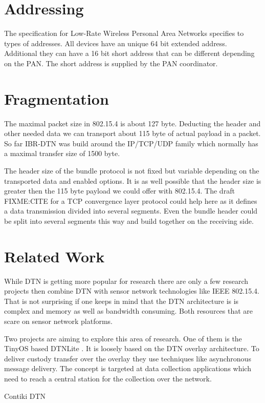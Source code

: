 \section{Addressing}

The specification for Low-Rate Wireless Personal Area Networks specifies to
types of addresses. All devices have an unique 64 bit extended address.
Additional they can have a 16 bit short address that can be different depending
on the PAN. The short address is supplied by the PAN coordinator.

\section{Fragmentation}

The maximal packet size in 802.15.4 is about 127 byte. Deducting the header
and other needed data we can transport about 115 byte of actual payload in a
packet. So far IBR-DTN was build around the IP/TCP/UDP family which normally has
a maximal transfer size of 1500 byte.

The header size of the bundle protocol is not fixed but variable depending on
the transported data and enabled options. It is as well possible that the header
size is greater then the 115 byte payload we could offer with 802.15.4. The
draft FIXME:CITE for a TCP convergence layer protocol could help here as it
defines a data transmission divided into several segments. Even the bundle
header could be split into several segments this way and build together on the
receiving side.

\section{Related Work}

While DTN is getting more popular for research there are only a few research
projects then combine DTN with sensor network technologies like IEEE 802.15.4.
That is not surprising if one keeps in mind that the DTN architecture is is
complex and memory as well as bandwidth consuming. Both resources that are scare
on sensor network platforms.

Two projects are aiming to explore this area of research. One of them is the
TinyOS based DTNLite \cite{dtnlite}. It is loosely based on the DTN overlay
architecture. To deliver custody transfer  over the overlay they use techniques
like asynchronous message delivery. The concept is targeted at data collection
applications which need to reach a central station for the collection over the
network.

Contiki DTN

